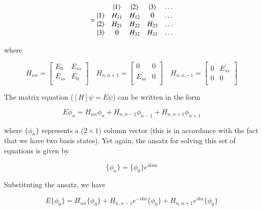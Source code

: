 \documentclass{resonance}
\begin{document}
\begin{equation}
[H] =
\begin{matrix}
     & \ket{1} & \ket{2} & \ket{3} & \ldots \\
    \ket{1} & H_{11} & H_{12} & 0 & \ldots \\
    \ket{2} & H_{21} & H_{22} & H_{23} & \ldots \\
    \ket{3} & 0 & H_{32} & H_{33} & \ldots \\
\end{matrix}   
\end{equation}

where

\begin{equation*}
H_{nn} =
\begin{bmatrix}
    E_{0} & E_{ss} \\
    E_{ss} & E_{0} \\
\end{bmatrix}  \quad
H_{n,n+1} =
\begin{bmatrix}
    0 & 0 \\
    E_{ss}^{'} & 0 \\
\end{bmatrix}  \quad
H_{n,n-1} =
\begin{bmatrix}
    0 & E_{ss}^{'} \\
    0 & 0 \\
\end{bmatrix}  
\end{equation*}

The matrix equation ($[H]\psi = E\psi$) can be written in the form

\begin{equation}
    E\phi_n = H_{nn}\phi_n + H_{n,n-1}\phi_{n-1} + H_{n,n+1}\phi_{n+1}
\end{equation}

where $\{\phi_{n}\}$ represents a ($2 \times 1$) column vector (this is in accordance with the fact that we have two basis states). Yet again, the ansatz for solving this set of equations is given by

\begin{equation}
    \{\phi_n\} = \{\phi_0\}e^{ikna}
\end{equation}

Substituting the ansatz, we have

\begin{equation*}
    E\{\phi_0\} = H_{nn}\{\phi_0\} + H_{n,n-1}e^{-ika}\{\phi_0\} + H_{n,n+1}e^{ika}\{\phi_0\}
\end{equation*}
\end{document}
